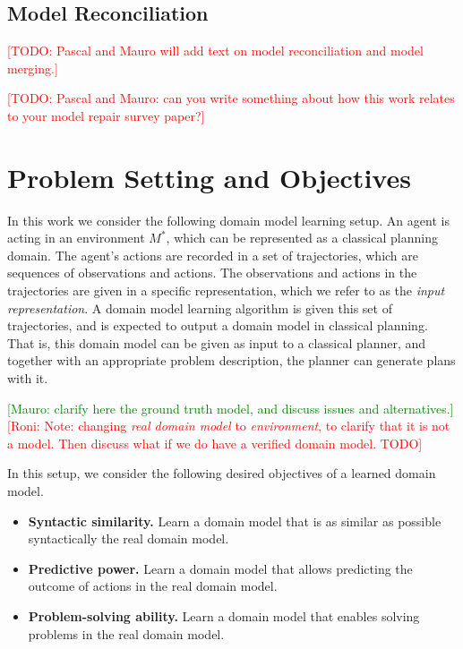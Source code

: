 \documentclass{article}
\theoremstyle{definition}
\theoremstyle{remark}
\newcommand{\realm}{\ensuremath{M^*}\xspace}
\newcommand{\todo}[1]{{\textcolor{red}{[TODO: #1]}}}
\newcommand{\roni}[1]{{\textcolor{red}{[Roni: #1]}}}
\newcommand{\mauro}[1]{{\textcolor{green}{[Mauro: #1]}}}
\begin{document}
\subsection{Model Reconciliation}

\todo{Pascal and Mauro will add text on model reconciliation and model merging.}

\todo{Pascal and Mauro: can you write something about how this work relates to your model repair survey paper?}





\section{Problem Setting and Objectives}
\label{sec:problem-setting}

In this work we consider the following domain model learning setup. 
An agent is acting in an environment $\realm$, 
which can be represented as a classical planning domain. 
The agent's actions are recorded in a set of trajectories, which are sequences of observations and actions. 
The observations and actions in the trajectories are given in a specific representation, which we refer to as the \emph{input representation}. 
A domain model learning algorithm is given this set of trajectories, and is expected to output a domain model in classical planning. 
That is, this domain model can be given as input to a classical planner, and together with an appropriate problem description, the planner can generate plans with it. 

\mauro{clarify here the ground truth model, and discuss issues and alternatives.}
\roni{Note: changing \emph{real domain model} to \emph{environment}, to clarify that it is not a model. Then discuss what if we do have a verified domain model. TODO}



In this setup, we consider the following desired objectives of a learned domain model. 
\begin{itemize}
    \item \textbf{Syntactic similarity.} Learn a domain model that is as similar as possible syntactically the real domain model. 
    \item \textbf{Predictive power.} Learn a domain model that allows predicting the outcome of actions in the real domain model. 
    \item \textbf{Problem-solving ability.} Learn a domain model that enables solving problems in the real domain model.      
\end{itemize}
\end{document}
